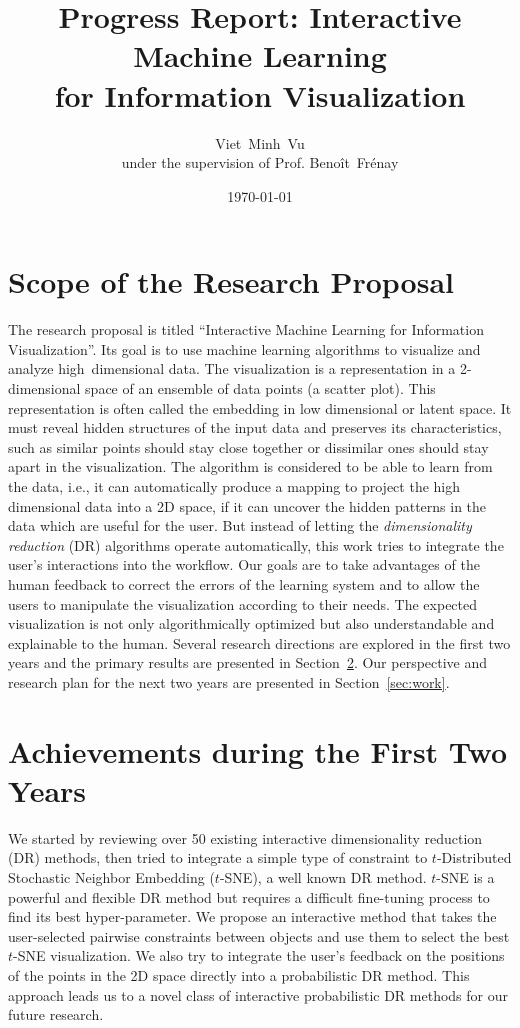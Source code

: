 \documentclass[11pt, a4paper]{article}
\title{Progress Report: Interactive Machine Learning\\ for Information Visualization}
\author{Viet~Minh~Vu\\ under the supervision of Prof. Beno\^it~Fr\'enay}
\date{\today}
\begin{document}
 
\maketitle

\section{Scope of the Research Proposal}
The research proposal is titled ``Interactive Machine Learning for Information Visualization''.
Its goal is to use machine learning algorithms to visualize and analyze high~dimensional data.
The visualization is a representation in a 2-dimensional space of an ensemble of data points (a scatter plot).
This representation is often called the embedding in low dimensional or latent space.
It must reveal hidden structures of the input data and preserves its characteristics, such as similar points should stay close together or dissimilar ones should stay apart in the visualization.
The algorithm is considered to be able to learn from the data, i.e., it can automatically produce a mapping to project the high dimensional data into a 2D space, if it can uncover the hidden patterns in the data which are useful for the user.
But instead of letting the \emph{dimensionality reduction} (DR) algorithms operate automatically, this work tries to integrate the user's interactions into the workflow.
Our goals are to take advantages of the human feedback to correct the errors of the learning system and to allow the users to manipulate the visualization according to their needs.
The expected visualization is not only algorithmically optimized but also understandable and explainable to the human.
Several research directions are explored in the first two years and the primary results are presented in Section~\ref{sec:results}. Our perspective and research plan for the next two years are presented in Section~\ref{sec:work}.


\section{Achievements during the First Two Years}\label{sec:results}
We started by reviewing over 50 existing interactive dimensionality reduction (DR) methods, then tried to integrate a simple type of constraint to $t$-Distributed Stochastic Neighbor Embedding ($t$-SNE), a well known DR method.
$t$-SNE is a powerful and flexible DR method but requires a difficult fine-tuning process to find its best hyper-parameter. 
We propose an interactive method that takes the user-selected pairwise constraints between objects and use them to select the best $t$-SNE visualization.
We also try to integrate the user's feedback on the positions of the points in the 2D space directly into a probabilistic DR method.
This approach leads us to a novel class of interactive probabilistic DR methods for our future research.
 
\end{document}
